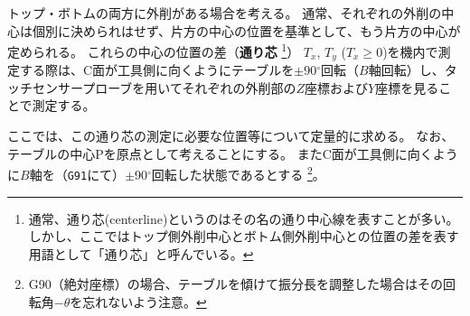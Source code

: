 


トップ・ボトムの両方に外削がある場合を考える。
通常、それぞれの外削の中心は個別に決められはせず、片方の中心の位置を基準として、もう片方の中心が定められる。
これらの中心の位置の差（\textbf{通り芯}
\footnote{通常、通り芯(centerline)というのはその名の通り中心線を表すことが多い。
しかし、ここではトップ側外削中心とボトム側外削中心との位置の差を表す用語として「通り芯」と呼んでいる。}）
$T_x$, $T_y$ ($T_x \geq 0$)を機内で測定する際は、C面が工具側に向くようにテーブルを$\pm$90$^\circ$回転（$B$軸回転）し、タッチセンサープローブを用いてそれぞれの外削部の$Z$座標および$Y$座標を見ることで測定する。

ここでは、この通り芯の測定に必要な位置等について定量的に求める。
なお、テーブルの中心Pを原点として考えることにする。
またC面が工具側に向くように$B$軸を（\verb|G91|にて）$\pm$90$^\circ$回転した状態であるとする
\footnote{{\ttfamily G90}（絶対座標）の場合、テーブルを傾けて振分長を調整した場合はその回転角$-\theta$を忘れないよう注意。}。



